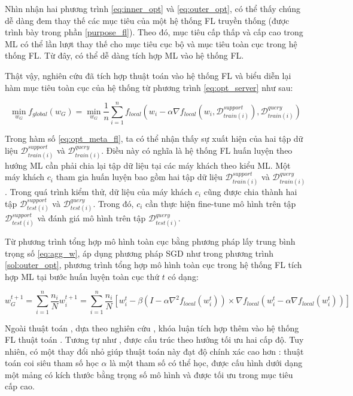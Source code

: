 Nhìn nhận hai phương trình \ref{eq:inner_opt} và \ref{eq:outer_opt}, có thể thấy chúng dễ dàng đem thay thế các mục tiêu của một hệ thống FL truyền thống (được trình bày trong phần \ref{purpose_fl}). Theo đó, mục tiêu cấp thấp và cấp cao trong ML có thể lần lượt thay thế cho mục tiêu cục bộ và mục tiêu toàn cục trong hệ thống FL. Từ đây, có thể dễ dàng tích hợp ML vào hệ thống FL.

Thật vậy, nghiên cứu \cite{fallah2020personalized} đã tích hợp thuật toán  vào hệ thống FL và biểu diễn lại hàm mục tiêu toàn cục của hệ thống từ phương trình \ref{eq:opt_server} như sau:

\begin{equation}
    \label{eq:opt_meta_fl}
    \min_{w_G} f_{global}(w_G)
        =\min_{w_G} \frac{1}{n} \sum_{i=1}^n f_{local}\left(w_i - \alpha \nabla f_{local}(w_i, \mathcal{D}_{train(i)}^{support}), \mathcal{D}_{train(i)}^{query}\right)
\end{equation}

Trong hàm số \ref{eq:opt_meta_fl}, ta có thể nhận thấy sự xuất hiện của hai tập dữ liệu $\mathcal{D}_{train(i)}^{support}$ và $\mathcal{D}_{train(i)}^{query}$. Điều này có nghĩa là hệ thống FL huấn luyện theo hướng ML cần phải chia lại tập dữ liệu tại các máy khách theo kiểu ML. Một máy khách $c_i$ tham gia huấn luyện bao gồm hai tập dữ liệu $\mathcal{D}_{train(i)}^{support}$ và $\mathcal{D}_{train(i)}^{query}$. Trong quá trình kiểm thử, dữ liệu của máy khách $c_i$ cũng được chia thành hai tập $\mathcal{D}_{test(i)}^{support}$ và $\mathcal{D}_{test(i)}^{query}$. Trong đó, $c_i$ cần thực hiện fine-tune mô hình trên tập $\mathcal{D}_{test(i)}^{support}$ và đánh giá mô hình trên tập $\mathcal{D}_{test(i)}^{query}$.

Từ phương trình tổng hợp mô hình toàn cục bằng phương pháp lấy trung bình trọng số \ref{eq:agg_w}, áp dụng phương pháp SGD như trong phương trình \ref{sol:outer_opt}, phương trình tổng hợp mô hình toàn cục trong hệ thống FL tích hợp ML tại bước huấn luyện toàn cục thứ $t$ có dạng:

\begin{dmath}
    \label{eq:agg_fedmeta}
    w_G^{t+1} = \sum_{i=1}^n{\frac{n_i}{N} w_i^{t+1}}
        = \sum_{i=1}^n{\frac{n_i}{N}\left[ w_i^t - \beta \left( I - \alpha \nabla^2 f_{local}(w_i^t) \right) \times \nabla f_{local}\left( w_i^t - \alpha\nabla f_{local}(w_i^t)\right) \right]}
\end{dmath}

Ngoài thuật toán , dựa theo nghiên cứu \cite{chen2018federated}, khóa luận tích hợp thêm vào hệ thống FL thuật toán . Tương tự như ,  được cấu trúc theo hướng tối ưu hai cấp độ. Tuy nhiên, có một thay đổi nhỏ giúp thuật toán này đạt độ chính xác cao hơn : thuật toán coi siêu tham số học $\alpha$ là một tham số có thể học, được cấu hình dưới dạng một mảng có kích thước bằng trọng số mô hình và được tối ưu trong mục tiêu cấp cao.

